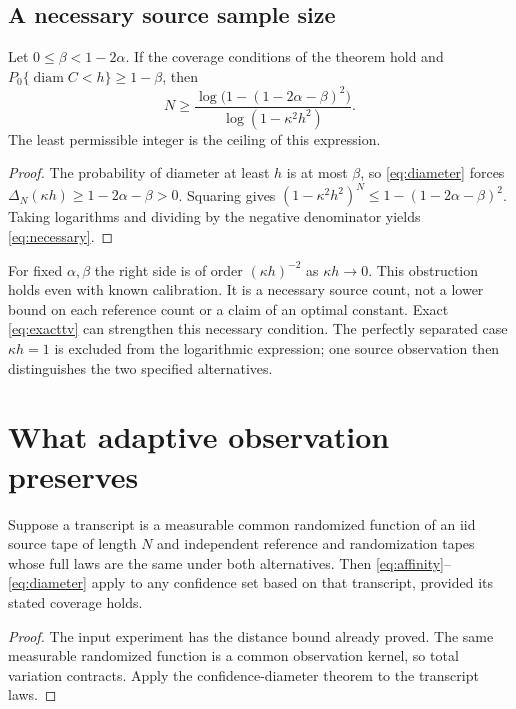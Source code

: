 \documentclass[11pt,a4paper]{article}
\newcommand{\diam}{\operatorname{diam}}
\begin{document}
\subsection{A necessary source sample size}

\begin{corollary}
Let $0\le\beta<1-2\alpha$. If the coverage conditions of the theorem hold and
$P_0\{\diam C<h\}\ge1-\beta$, then
\begin{equation}
 N\ge
 \frac{\log\bigl(1-(1-2\alpha-\beta)^2\bigr)}
      {\log(1-\kappa^2h^2)}.
 \label{eq:necessary}
\end{equation}
The least permissible integer is the ceiling of this expression.
\end{corollary}
\begin{proof}
The probability of diameter at least $h$ is at most $\beta$, so \eqref{eq:diameter} forces $\Delta_N(\kappa h)\ge1-2\alpha-\beta>0$. Squaring gives
$(1-\kappa^2h^2)^N\le1-(1-2\alpha-\beta)^2$. Taking logarithms and dividing by the negative denominator yields \eqref{eq:necessary}.
\end{proof}

For fixed $\alpha,\beta$ the right side is of order $(\kappa h)^{-2}$ as $\kappa h\to0$. This obstruction holds even with known calibration. It is a necessary source count, not a lower bound on each reference count or a claim of an optimal constant. Exact \eqref{eq:exacttv} can strengthen this necessary condition. The perfectly separated case $\kappa h=1$ is excluded from the logarithmic expression; one source observation then distinguishes the two specified alternatives.

\section{What adaptive observation preserves}

\begin{proposition}
Suppose a transcript is a measurable common randomized function of an iid source tape of length $N$ and independent reference and randomization tapes whose full laws are the same under both alternatives. Then \eqref{eq:affinity}--\eqref{eq:diameter} apply to any confidence set based on that transcript, provided its stated coverage holds.
\end{proposition}
\begin{proof}
The input experiment has the distance bound already proved. The same measurable randomized function is a common observation kernel, so total variation contracts. Apply the confidence-diameter theorem to the transcript laws.
\end{proof}
\end{document}
